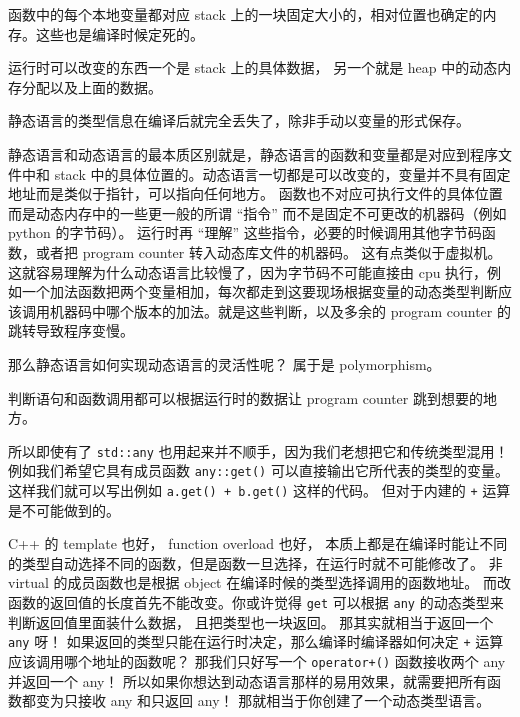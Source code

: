 函数中的每个本地变量都对应 stack 上的一块固定大小的，相对位置也确定的内存。这些也是编译时候定死的。

运行时可以改变的东西一个是 stack 上的具体数据， 另一个就是 heap 中的动态内存分配以及上面的数据。

静态语言的类型信息在编译后就完全丢失了，除非手动以变量的形式保存。

静态语言和动态语言的最本质区别就是，静态语言的函数和变量都是对应到程序文件中和 stack 中的具体位置的。动态语言一切都是可以改变的，变量并不具有固定地址而是类似于指针，可以指向任何地方。 函数也不对应可执行文件的具体位置而是动态内存中的一些更一般的所谓 “指令” 而不是固定不可更改的机器码（例如 python 的字节码）。 运行时再 “理解” 这些指令，必要的时候调用其他字节码函数，或者把 program counter 转入动态库文件的机器码。 这有点类似于虚拟机。 这就容易理解为什么动态语言比较慢了，因为字节码不可能直接由 cpu 执行，例如一个加法函数把两个变量相加，每次都走到这要现场根据变量的动态类型判断应该调用机器码中哪个版本的加法。就是这些判断，以及多余的 program counter 的跳转导致程序变慢。

那么静态语言如何实现动态语言的灵活性呢？ 属于是 polymorphism。

判断语句和函数调用都可以根据运行时的数据让 program counter 跳到想要的地方。

所以即使有了 \verb`std::any` 也用起来并不顺手，因为我们老想把它和传统类型混用！例如我们希望它具有成员函数 \verb`any::get()` 可以直接输出它所代表的类型的变量。 这样我们就可以写出例如 \verb`a.get() + b.get()` 这样的代码。 但对于内建的 \verb`+` 运算是不可能做到的。

C++ 的 template 也好， function overload 也好， 本质上都是在编译时能让不同的类型自动选择不同的函数，但是函数一旦选择，在运行时就不可能修改了。 非 virtual 的成员函数也是根据 object 在编译时候的类型选择调用的函数地址。 而改函数的返回值的长度首先不能改变。你或许觉得 \verb`get` 可以根据 \verb`any` 的动态类型来判断返回值里面装什么数据， 且把类型也一块返回。 那其实就相当于返回一个 \verb`any` 呀！ 如果返回的类型只能在运行时决定，那么编译时编译器如何决定 \verb`+` 运算应该调用哪个地址的函数呢？ 那我们只好写一个 \verb`operator+()` 函数接收两个 any 并返回一个 any！ 所以如果你想达到动态语言那样的易用效果，就需要把所有函数都变为只接收 any 和只返回 any！ 那就相当于你创建了一个动态类型语言。
